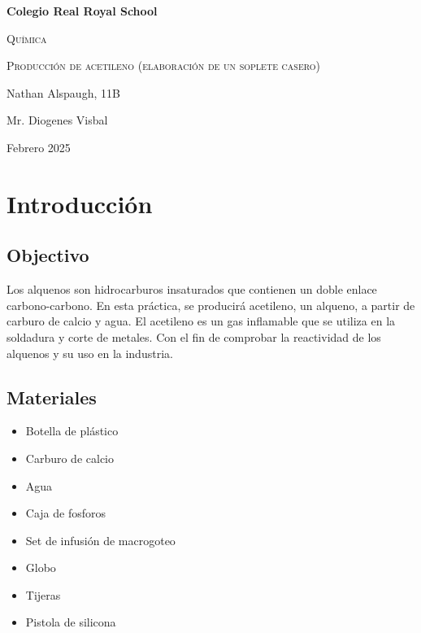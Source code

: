 \documentclass{article}
\begin{document}
\pagestyle{fancy}
\fancyhead{} %
\fancyhead[RO,RO]{\thepage}
\begin{titlepage}
      \centering
      {\bfseries\LARGE Colegio Real Royal School \par}
      \vspace{1cm}
      {\scshape\Large Qu\'imica \par}
      \vspace{3cm}
      {\scshape\Huge Producci\'on de acetileno (elaboraci\'on de un soplete casero) \par}
      \vfill
      {\Large Nathan Alspaugh, 11B  \par}
      \vfill
      {\Large Mr. Diogenes Visbal \par}
      \vfill
      {\Large Febrero 2025 \par}
\end{titlepage}
\setcounter{section}{1}
\section*{Introducci\'on}
\subsection{Objectivo}
Los alquenos son hidrocarburos insaturados que contienen un doble enlace carbono-carbono. En esta pr\'actica, se producir\'a acetileno, un alqueno, a partir de carburo de calcio y agua. El acetileno es un gas inflamable que se utiliza en la soldadura y corte de metales. Con el fin de comprobar la reactividad de los alquenos y su uso en la industria.
\subsection{Materiales}
\begin{itemize}
      \item Botella de pl\'astico
      \item Carburo de calcio
      \item Agua
      \item Caja de fosforos
      \item Set de infusión de macrogoteo
      \item Globo
      \item Tijeras
      \item Pistola de silicona
\end{itemize}
\end{document}
